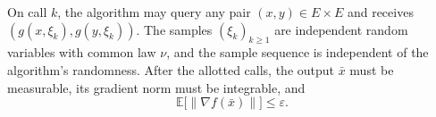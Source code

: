 \documentclass[10pt]{article}
\theoremstyle{definition}
\begin{document}
On call $k$, the algorithm may query any pair $(x,y)\in E\times E$ and receives $(g(x,\xi_k),g(y,\xi_k))$. The samples $(\xi_k)_{k\geq 1}$ are independent random variables with common law $\nu$, and the sample sequence is independent of the algorithm's randomness. After the allotted calls, the output $\bar{x}$ must be measurable, its gradient norm must be integrable, and
\[
\mathbb{E}\bigl[\|\nabla f(\bar{x})\|\bigr]\leq\varepsilon.
\]
\end{document}
